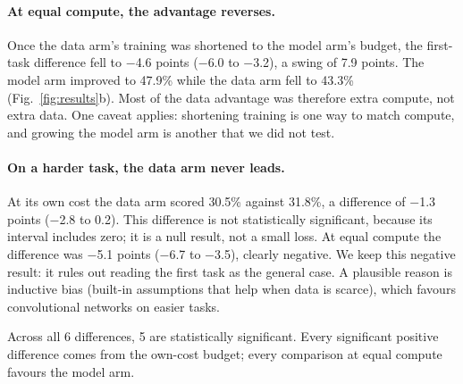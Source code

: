 \documentclass[pdflatex,sn-mathphys-num]{sn-jnl}
\newcommand{\accDataFirstEqc}{43.3}
\newcommand{\accDataHardOwn}{30.5}
\newcommand{\accModelFirstEqc}{47.9}
\newcommand{\accModelHardOwn}{31.8}
\newcommand{\dFirstEqc}{\ensuremath{-}4.6}
\newcommand{\dHardEqc}{\ensuremath{-}5.1}
\newcommand{\dHardOwn}{\ensuremath{-}1.3}
\newcommand{\hiFirstEqc}{\ensuremath{-}3.2}
\newcommand{\hiHardEqc}{\ensuremath{-}3.5}
\newcommand{\hiHardOwn}{0.2}
\newcommand{\loFirstEqc}{\ensuremath{-}6.0}
\newcommand{\loHardEqc}{\ensuremath{-}6.7}
\newcommand{\loHardOwn}{\ensuremath{-}2.8}
\newcommand{\nCompared}{6}
\newcommand{\nSig}{5}
\newcommand{\swingFirst}{7.9}
\begin{document}
\paragraph{At equal compute, the advantage reverses.} Once the data arm's training was
shortened to the model arm's budget, the first-task difference fell to \dFirstEqc{} points
(\loFirstEqc{} to \hiFirstEqc{}), a swing of \swingFirst{} points. The model arm improved
to \accModelFirstEqc{}\% while the data arm fell to \accDataFirstEqc{}\%
(Fig.~\ref{fig:results}b). Most of the data advantage was therefore extra compute, not
extra data. One caveat applies: shortening training is one way to match compute, and
growing the model arm is another that we did not test.

\paragraph{On a harder task, the data arm never leads.} At its own cost the data arm scored
\accDataHardOwn{}\% against \accModelHardOwn{}\%, a difference of \dHardOwn{} points
(\loHardOwn{} to \hiHardOwn{}). This difference is not statistically significant, because
its interval includes zero; it is a null result, not a small loss. At equal compute the
difference was \dHardEqc{} points (\loHardEqc{} to \hiHardEqc{}), clearly negative. We keep
this negative result: it rules out reading the first task as the general case. A plausible
reason is inductive bias (built-in assumptions that help when data is scarce), which
favours convolutional networks on easier tasks.

Across all \nCompared{} differences, \nSig{} are statistically significant. Every significant
positive difference comes from the own-cost budget; every comparison at equal compute
favours the model arm.
\end{document}

